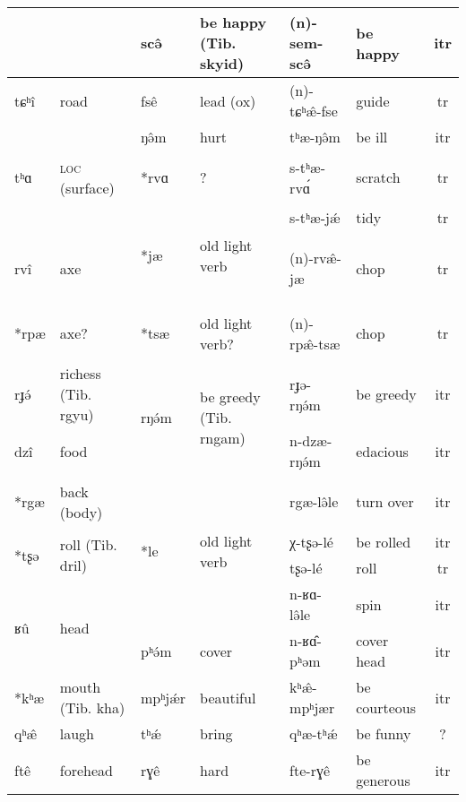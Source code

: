 \documentclass[11pt, a4paper]{book}              %
\newcommand{\ipa}[1]{{\phon \mbox{#1}}} %
\begin{document}
\begin{table}[H]
{\begin{tabular}{ ll|ll|ll|c }
 & &  \ipa{scə̂} & be happy (Tib. \ipa{skyid}) & \ipa{(n)-sem-scə̂} & be happy & itr\\
 \hline
\ipa{tɕʰî} & road & \ipa{fsê} & lead (ox) & \ipa{(n)-tɕʰæ̂-fse} & guide & tr \\ \hline 
\multirow{3}{*}{\hypertarget{tha}{\ipa{tʰɑ}}} & \multirow{3}{*}{\textsc{loc} (surface)} & \ipa{ŋə̂m}  & hurt & \ipa{tʰæ-ŋə̂m} & be ill & itr \\ \cline{3-7}
   & &  \hypertarget{rva}{\ipa{*rvɑ}} & ? & \ipa{s-tʰæ-rvɑ́} & scratch & tr\\ \cline{3-7}
    & &   \multirow{2}{*}{\hypertarget{ja}{\ipa{*jæ}}} &  \multirow{2}{*}{old light verb} & \ipa{s-tʰæ-jǽ} & tidy & tr\\ \cline{1-2} \cline{5-7}
   \ipa{rvî} & axe & &  & \hypertarget{rvaja}{\ipa{(n)-rvæ̂-jæ}} & chop & tr \\ \hline
   \hypertarget{rpa}{\ipa{*rpæ}} & axe? & \hypertarget{tsa}{\ipa{*tsæ}} & old light verb? & \ipa{(n)-rpæ̂-tsæ} & chop & tr \\ \hline
\ipa{rɟə́} & richess (Tib. {rgyu})  & \multirow{2}{*}{\ipa{rŋə́m}} & \multirow{2}{*}{be greedy (Tib. \ipa{rngam})} & \ipa{rɟə-rŋə́m} & be greedy & itr \\ \cline{1-2} \cline{5-7}
\ipa{dzî} & food & &   & \ipa{n-dzæ-rŋə́m} & edacious & itr \\ \hline
\hypertarget{rga}{\ipa{*rgæ}} & back (body) & \multirow{4}{*}{\hypertarget{le}{\ipa{*le}}} & \multirow{4}{*}{old light verb} & \ipa{rgæ-lə̂le} & turn over & itr \\ \cline{1-2} \cline{5-7}
\multirow{2}{*}{\ipa{*tʂə}} & \multirow{2}{*}{roll (Tib. \ipa{dril})} & \multirow{2}{*}{}  & \multirow{2}{*}{}   & \ipa{χ-tʂə-lé} & be rolled & itr \\  \cline{5-7}
  & & & & \ipa{tʂə-lé} & roll & tr \\ \cline{5-7}
\multirow{2}{*}{\ipa{ʁû}} & \multirow{2}{*}{head} &  &  & \ipa{n-ʁɑ-lə̂le} & spin & itr \\ \cline{3-7}
 & &  \ipa{pʰə́m} & cover & \ipa{n-ʁɑ̂-pʰəm} & cover head & itr \\
 \hline
 \ipa{*kʰæ} & mouth (Tib. \ipa{kha}) & \ipa{mpʰjǽr} & beautiful & \ipa{kʰæ̂-mpʰjær} & be courteous & itr \\ \hline
  \ipa{qʰæ̂} & laugh & \ipa{tʰǽ} & bring & \ipa{qʰæ-tʰǽ} & be funny & ? \\ \hline
   \ipa{ftê} & forehead & \ipa{rɣê} & hard & \ipa{fte-rɣê} & be generous & itr \\ \hline

\end{tabular}}
\end{table}
\end{document}
